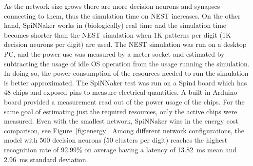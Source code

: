 As the network size grows there are more decision neurons and synapses connecting to them, thus the simulation time on NEST increases.
On the other hand, SpiNNaker works in (biologically) real time and the simulation time becomes shorter than the NEST simulation when 1K patterns per digit (1K decision neurons per digit) are used.
The NEST simulation was run on a desktop PC, and the power use was measured by a meter socket and estimated by subtracting the usage of idle OS operation from the usage running the simulation.
In doing so, the power consumption of the resources needed to run the simulation is better approximated.
The SpiNNaker test was run on a Spin4 board which has 48 chips and exposed pins to measure electrical quantities.
A built-in Arduino board provided a measurement read out of the power usage of the chips.
For the same goal of estimating just the required resources, only the active chips were measured.
Even with the smallest network, SpiNNaker wins in the energy cost comparison, see Figure~\ref{fig:energy}.
Among different network configurations, the model with 500 decision neurons (50 clusters per digit) reaches the highest recognition rate of 92.99\% on average having a latency of 13.82~ms mean and 2.96~ms standard deviation.
